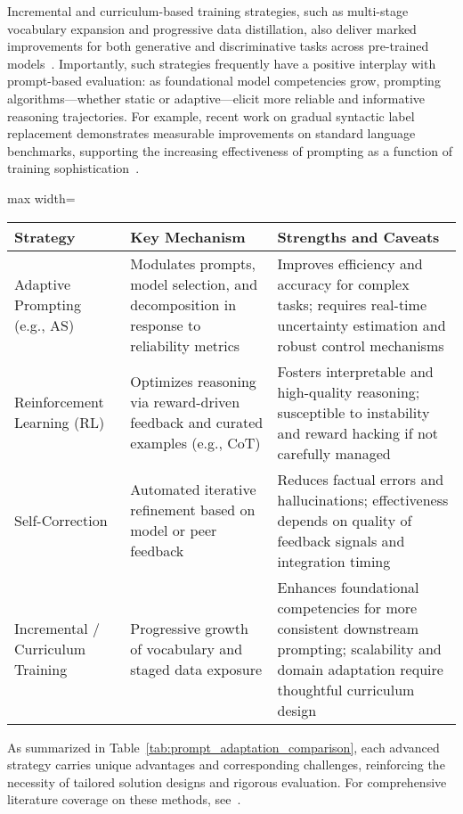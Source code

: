 \documentclass[sigconf]{acmart}
\begin{document}
Incremental and curriculum-based training strategies, such as multi-stage vocabulary expansion and progressive data distillation, also deliver marked improvements for both generative and discriminative tasks across pre-trained models~\cite{ref49,ref103}. Importantly, such strategies frequently have a positive interplay with prompt-based evaluation: as foundational model competencies grow, prompting algorithms—whether static or adaptive—elicit more reliable and informative reasoning trajectories. For example, recent work on gradual syntactic label replacement demonstrates measurable improvements on standard language benchmarks, supporting the increasing effectiveness of prompting as a function of training sophistication~\cite{ref103}.

\begin{table*}[htbp]
\centering
\caption{Comparison of Advanced Prompting and Adaptation Strategies}
\label{tab:prompt_adaptation_comparison}
\begin{adjustbox}{max width=\textwidth}
\begin{tabular}{lll}
\toprule
\textbf{Strategy} & \textbf{Key Mechanism} & \textbf{Strengths and Caveats} \\
\midrule
Adaptive Prompting (e.g., AS) & Modulates prompts, model selection, and decomposition in response to reliability metrics & Improves efficiency and accuracy for complex tasks; requires real-time uncertainty estimation and robust control mechanisms \\
Reinforcement Learning (RL) & Optimizes reasoning via reward-driven feedback and curated examples (e.g., CoT) & Fosters interpretable and high-quality reasoning; susceptible to instability and reward hacking if not carefully managed \\
Self-Correction & Automated iterative refinement based on model or peer feedback & Reduces factual errors and hallucinations; effectiveness depends on quality of feedback signals and integration timing \\
Incremental / Curriculum Training & Progressive growth of vocabulary and staged data exposure & Enhances foundational competencies for more consistent downstream prompting; scalability and domain adaptation require thoughtful curriculum design \\
\bottomrule
\end{tabular}
\end{adjustbox}
\end{table*}

As summarized in Table~\ref{tab:prompt_adaptation_comparison}, each advanced strategy carries unique advantages and corresponding challenges, reinforcing the necessity of tailored solution designs and rigorous evaluation. For comprehensive literature coverage on these methods, see~\cite{ref1,ref4,ref6,ref49,ref56,ref57,ref68,ref86,ref103}.
\end{document}
